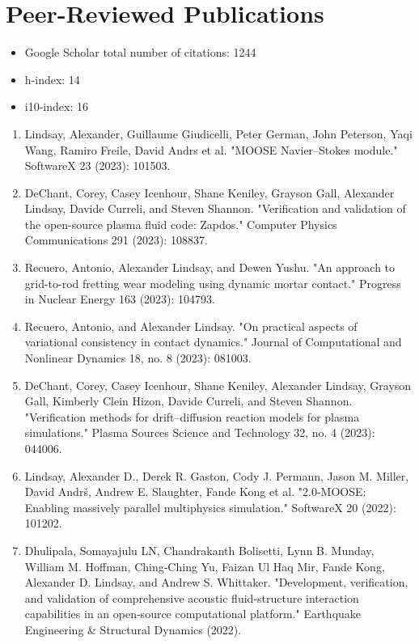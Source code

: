 \section{Peer-Reviewed Publications}
\begin{itemize}
\item Google Scholar total number of citations: 1244
\item h-index: 14
\item i10-index: 16
\end{itemize}

\begin{enumerate}
  \item Lindsay, Alexander, Guillaume Giudicelli, Peter German, John Peterson, Yaqi Wang, Ramiro Freile, David Andrs et al. "MOOSE Navier–Stokes module." SoftwareX 23 (2023): 101503.
  \item DeChant, Corey, Casey Icenhour, Shane Keniley, Grayson Gall, Alexander Lindsay, Davide Curreli, and Steven Shannon. "Verification and validation of the open-source plasma fluid code: Zapdos." Computer Physics Communications 291 (2023): 108837.
  \item Recuero, Antonio, Alexander Lindsay, and Dewen Yushu. "An approach to grid-to-rod fretting wear modeling using dynamic mortar contact." Progress in Nuclear Energy 163 (2023): 104793.
  \item Recuero, Antonio, and Alexander Lindsay. "On practical aspects of variational consistency in contact dynamics." Journal of Computational and Nonlinear Dynamics 18, no. 8 (2023): 081003.
  \item DeChant, Corey, Casey Icenhour, Shane Keniley, Alexander Lindsay, Grayson Gall, Kimberly Clein Hizon, Davide Curreli, and Steven Shannon. "Verification methods for drift–diffusion reaction models for plasma simulations." Plasma Sources Science and Technology 32, no. 4 (2023): 044006.
  \item Lindsay, Alexander D., Derek R. Gaston, Cody J. Permann, Jason M. Miller, David Andrš, Andrew E. Slaughter, Fande Kong et al. "2.0-MOOSE: Enabling massively parallel multiphysics simulation." SoftwareX 20 (2022): 101202.
  \item Dhulipala, Somayajulu LN, Chandrakanth Bolisetti, Lynn B. Munday, William M. Hoffman, Ching‐Ching Yu, Faizan Ul Haq Mir, Fande Kong, Alexander D. Lindsay, and Andrew S. Whittaker. "Development, verification, and validation of comprehensive acoustic fluid‐structure interaction capabilities in an open‐source computational platform." Earthquake Engineering \& Structural Dynamics (2022).

\end{enumerate}
